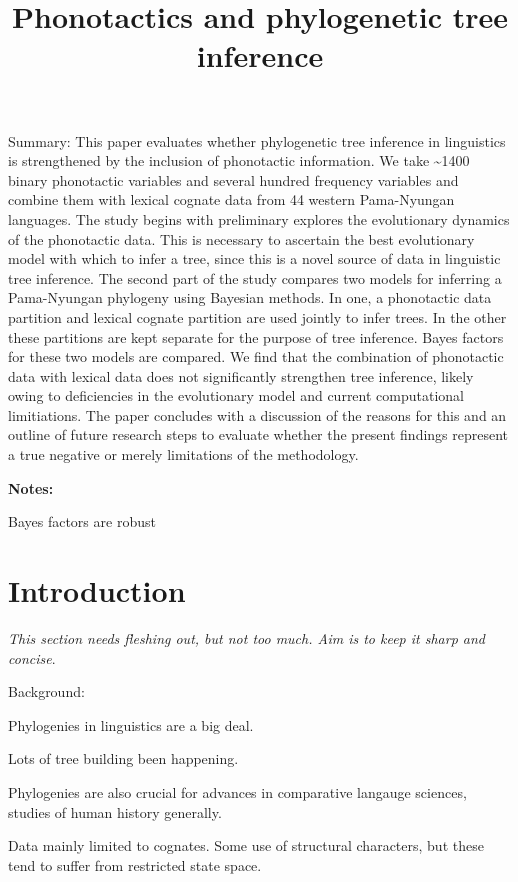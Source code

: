 \documentclass[]{article}
\title{Phonotactics and phylogenetic tree inference}
\author{}
\date{\vspace{-2.5em}}
\begin{document}
\maketitle

Summary: This paper evaluates whether phylogenetic tree inference in linguistics is strengthened by the inclusion of phonotactic information. We take \textasciitilde{}1400 binary phonotactic variables and several hundred frequency variables and combine them with lexical cognate data from 44 western Pama-Nyungan languages. The study begins with preliminary explores the evolutionary dynamics of the phonotactic data. This is necessary to ascertain the best evolutionary model with which to infer a tree, since this is a novel source of data in linguistic tree inference. The second part of the study compares two models for inferring a Pama-Nyungan phylogeny using Bayesian methods. In one, a phonotactic data partition and lexical cognate partition are used jointly to infer trees. In the other these partitions are kept separate for the purpose of tree inference. Bayes factors for these two models are compared. We find that the combination of phonotactic data with lexical data does not significantly strengthen tree inference, likely owing to deficiencies in the evolutionary model and current computational limitiations. The paper concludes with a discussion of the reasons for this and an outline of future research steps to evaluate whether the present findings represent a true negative or merely limitations of the methodology.

\textbf{Notes:}

Bayes factors are robust \autocite{brown_importance_2007}

\hypertarget{pn-tree-intro}{%
\section{Introduction}\label{pn-tree-intro}}

\emph{This section needs fleshing out, but not too much. Aim is to keep it sharp and concise}.

Background:

Phylogenies in linguistics are a big deal.

Lots of tree building been happening.

Phylogenies are also crucial for advances in comparative langauge sciences, studies of human history generally.

Data mainly limited to cognates. Some use of structural characters, but these tend to suffer from restricted state space.
\end{document}
